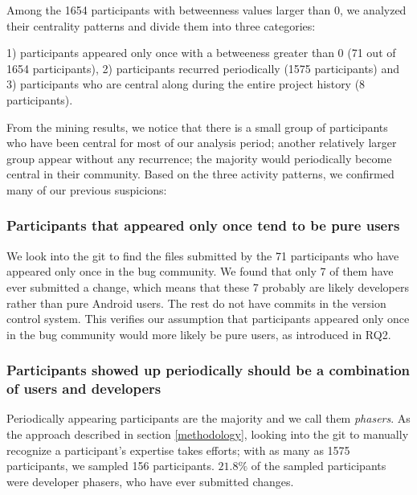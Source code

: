 \documentclass[conference]{IEEEtran}
\begin{document}
Among the 1654 participants with betweenness values larger than 0, we
analyzed their centrality patterns and divide them into three
categories: 

1) participants appeared only once with a betweeness greater than 0 (71 out of 1654
participants),
2) participants recurred periodically (1575 participants)
and 3) participants who are central along during the entire project
history (8 participants).


From the mining results, we notice that there is a small group of
participants who have been central for most of our analysis period; another
relatively larger group appear without any recurrence; the majority
would periodically become central in their community. Based on the
three activity patterns, we confirmed many of our previous suspicions:

\subsubsection{Participants that appeared only once tend to be pure users}

We look into the git to find the files
submitted by the 71 participants who have appeared only once in the
bug community. We found that only 7 of them have ever submitted a
change, which means that these 7 probably are likely developers rather
than pure Android users. The rest do not have commits in the version
control system. This verifies our assumption that participants
appeared only once in the bug community would more likely be pure
users, as introduced in RQ2.

\subsubsection{Participants showed up periodically should be a combination of users and developers}

Periodically appearing participants are the majority and we call them
\emph{phasers}. 
As the approach described in section \ref{methodology}, looking into the git to manually recognize a participant's expertise takes efforts; with as many as 1575 participants, we sampled 156 participants. $21.8\%$ of the sampled participants were developer phasers, who have ever submitted changes.
\end{document}

